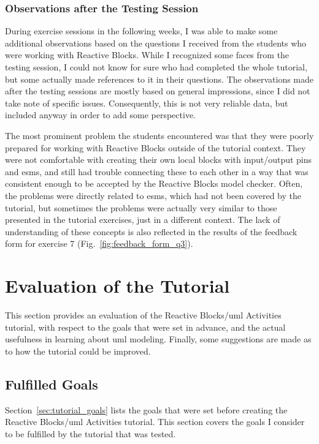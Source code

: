 \subsubsection{Observations after the Testing Session}
During exercise sessions in the following weeks, I was able to make some additional observations based on the questions I received from the students who were working with Reactive Blocks. While I recognized some faces from the testing session, I could not know for sure who had completed the whole tutorial, but some actually made references to it in their questions. The observations made after the testing sessions are mostly based on general impressions, since I did not take note of specific issues. Consequently, this is not very reliable data, but included anyway in order to add some perspective.

\noindent
The most prominent problem the students encountered was that they were poorly prepared for working with Reactive Blocks outside of the tutorial context. They were not comfortable with creating their own local blocks with input/output pins and \glspl{esm}, and still had trouble connecting these to each other in a way that was consistent enough to be accepted by the Reactive Blocks model checker. Often, the problems were directly related to \glspl{esm}, which had not been covered by the tutorial, but sometimes the problems were actually very similar to those presented in the tutorial exercises, just in a different context. The lack of understanding of these concepts is also reflected in the results of the feedback form for exercise 7 (Fig.~\ref{fig:feedback_form_q3}).

\section{Evaluation of the Tutorial}
\label{sec:tutorial_evaluation}
This section provides an evaluation of the Reactive Blocks/\gls{uml} Activities tutorial, with respect to the goals that were set in advance, and the actual usefulness in learning about \gls{uml} modeling. Finally, some suggestions are made as to how the tutorial could be improved.

\subsection{Fulfilled Goals}
\label{sec:tutorial_goal_fulfilled}
Section~\ref{sec:tutorial_goals} lists the goals that were set before creating the Reactive Blocks/\gls{uml} Activities tutorial. This section covers the goals I consider to be fulfilled by the tutorial that was tested.

